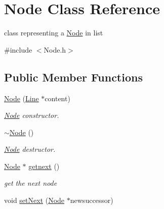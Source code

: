 \hypertarget{classNode}{
\section{Node Class Reference}
\label{classNode}
}


class representing a \hyperlink{classNode}{Node} in list  


{\ttfamily \#include $<$Node.h$>$}\subsection*{Public Member Functions}
\begin{DoxyCompactItemize}
\item 
\hypertarget{classNode_a38b4c6850bd8b7f57986ab2131b09918}{
\hyperlink{classNode_a38b4c6850bd8b7f57986ab2131b09918}{Node} (\hyperlink{classLine}{Line} $\ast$content)}
\label{classNode_a38b4c6850bd8b7f57986ab2131b09918}

\begin{DoxyCompactList}\small\item\em \hyperlink{classNode}{Node} constructor. \item\end{DoxyCompactList}\item 
\hypertarget{classNode_aa0840c3cb5c7159be6d992adecd2097c}{
\hyperlink{classNode_aa0840c3cb5c7159be6d992adecd2097c}{$\sim$Node} ()}
\label{classNode_aa0840c3cb5c7159be6d992adecd2097c}

\begin{DoxyCompactList}\small\item\em \hyperlink{classNode}{Node} destructor. \item\end{DoxyCompactList}\item 
\hypertarget{classNode_a046e20cbf67a4d935ba2d514f945684e}{
\hyperlink{classNode}{Node} $\ast$ \hyperlink{classNode_a046e20cbf67a4d935ba2d514f945684e}{getnext} ()}
\label{classNode_a046e20cbf67a4d935ba2d514f945684e}

\begin{DoxyCompactList}\small\item\em get the next node \item\end{DoxyCompactList}\item 
\hypertarget{classNode_ab6985950b4a04ba11e1f406d4e2151fb}{
void \hyperlink{classNode_ab6985950b4a04ba11e1f406d4e2151fb}{setNext} (\hyperlink{classNode}{Node} $\ast$newsuccessor)}
\label{classNode_ab6985950b4a04ba11e1f406d4e2151fb}


\end{DoxyCompactItemize}
